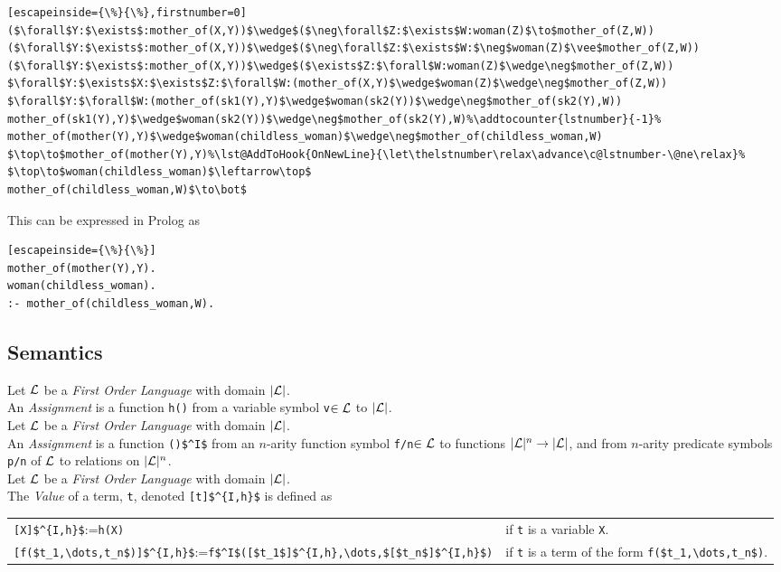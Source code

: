 \documentclass[11pt,a4paper]{article}
\begin{document}
\begin{lstlisting}[escapeinside={\%}{\%},firstnumber=0]
($\forall$Y:$\exists$:mother_of(X,Y))$\wedge$($\neg\forall$Z:$\exists$W:woman(Z)$\to$mother_of(Z,W))
($\forall$Y:$\exists$:mother_of(X,Y))$\wedge$($\neg\forall$Z:$\exists$W:$\neg$woman(Z)$\vee$mother_of(Z,W))
($\forall$Y:$\exists$:mother_of(X,Y))$\wedge$($\exists$Z:$\forall$W:woman(Z)$\wedge\neg$mother_of(Z,W))
$\forall$Y:$\exists$X:$\exists$Z:$\forall$W:(mother_of(X,Y)$\wedge$woman(Z)$\wedge\neg$mother_of(Z,W))
$\forall$Y:$\forall$W:(mother_of(sk1(Y),Y)$\wedge$woman(sk2(Y))$\wedge\neg$mother_of(sk2(Y),W))
mother_of(sk1(Y),Y)$\wedge$woman(sk2(Y))$\wedge\neg$mother_of(sk2(Y),W)%\addtocounter{lstnumber}{-1}% 
mother_of(mother(Y),Y)$\wedge$woman(childless_woman)$\wedge\neg$mother_of(childless_woman,W)
$\top\to$mother_of(mother(Y),Y)%\lst@AddToHook{OnNewLine}{\let\thelstnumber\relax\advance\c@lstnumber-\@ne\relax}%
$\top\to$woman(childless_woman)$\leftarrow\top$
mother_of(childless_woman,W)$\to\bot$
\end{lstlisting}
This can be expressed in Prolog as
\begin{lstlisting}[escapeinside={\%}{\%}]
mother_of(mother(Y),Y).
woman(childless_woman).
:- mother_of(childless_woman,W).
\end{lstlisting}

\subsection{Semantics}

Let $\mathcal{L}$ be a \textit{First Order Language} with domain $|\mathcal{L}|$.\\
An \textit{Assignment} is a function \lstinline!h()! from a variable symbol \lstinline!v!$\in\mathcal{L}$ to $|\mathcal{L}|$.\\


Let $\mathcal{L}$ be a \textit{First Order Language} with domain $|\mathcal{L}|$.\\
An \textit{Assignment} is a function \lstinline!()$^I$! from an $n$-arity function symbol \lstinline!f/n!$\in\mathcal{L}$ to functions $|\mathcal{L}|^n\to|\mathcal{L}|$, and from $n$-arity predicate symbols \lstinline!p/n! of $\mathcal{L}$ to relations on $|\mathcal{L}|^n$.\\

Let $\mathcal{L}$ be a \textit{First Order Language} with domain $|\mathcal{L}|$.\\
The \textit{Value} of a term, \lstinline!t!, denoted \lstinline![t]$^{I,h}$! is defined as
\begin{center}\begin{tabular}{ll}
\lstinline![X]$^{I,h}$!:=\lstinline!h(X)!&if \lstinline!t! is a variable \lstinline!X!.\\
\lstinline![f($t_1,\dots,t_n$)]$^{I,h}$!:=\lstinline!f$^I$([$t_1$]$^{I,h},\dots,$[$t_n$]$^{I,h}$)!& if \lstinline!t! is a term of the form \lstinline!f($t_1,\dots,t_n$)!.
\end{tabular}\end{center}
\end{document}
